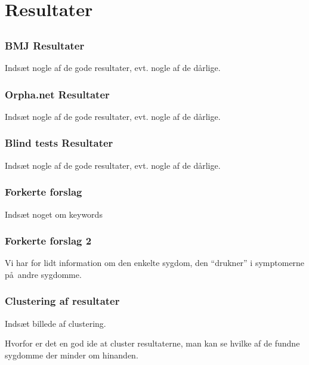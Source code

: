 \documentclass[xcolor=table]{beamer}
\begin{document}
\section{Resultater}

\subsection*{}

\begin{frame}

  \frametitle{BMJ Resultater}

  Inds\ae t nogle af de gode resultater, evt. nogle af de d\aa rlige.

\end{frame}

\begin{frame}

  \frametitle{Orpha.net Resultater}

  Inds\ae t nogle af de gode resultater, evt. nogle af de d\aa rlige.

\end{frame}

\begin{frame}

  \frametitle{Blind tests Resultater}

  Inds\ae t nogle af de gode resultater, evt. nogle af de d\aa rlige.

\end{frame}

\begin{frame}

  \frametitle{Forkerte forslag}

  Inds\ae t noget om keywords

\end{frame}

\begin{frame}

  \frametitle{Forkerte forslag 2}

  Vi har for lidt information om den enkelte sygdom, den ``drukner'' i symptomerne p\aa\ andre sygdomme.

\end{frame}

\begin{frame}

  \frametitle{Clustering af resultater}

  Inds\ae t billede af clustering.

  Hvorfor er det en god ide at cluster resultaterne, man kan se hvilke
  af de fundne sygdomme der minder om hinanden.

\end{frame}
\end{document}
